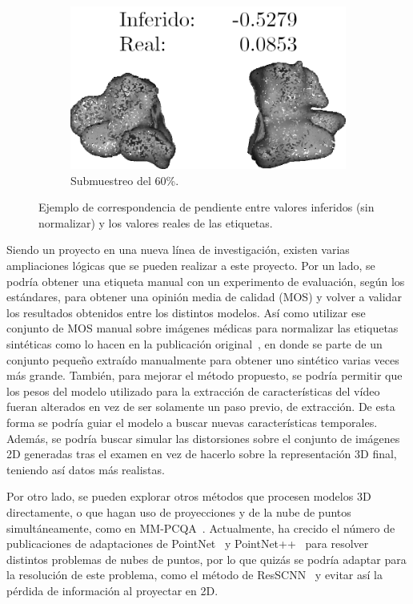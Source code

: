 \begin{figure}
  \begin{subfigure}[b]{0.31\textwidth}
  \centering
    \includegraphics[width=\textwidth]{imagenes/chapter6/Maxiliar100014_11.png}
  \caption{Submuestreo del 60\%.}
  \end{subfigure}
  \caption{Ejemplo de correspondencia de pendiente entre valores inferidos (sin normalizar) y 
  los valores reales de las etiquetas.} 
  \label{fig:Cualitativos}
\end{figure}


Siendo un proyecto en una nueva línea de investigación, existen varias ampliaciones 
lógicas que se pueden realizar a este proyecto. Por un lado, se podría 
obtener una etiqueta manual con un experimento de evaluación, según los estándares, para 
obtener una opinión media de calidad (MOS) y volver a validar los resultados obtenidos
entre los distintos modelos. Así como utilizar ese conjunto de MOS manual sobre imágenes médicas 
para normalizar las etiquetas sintéticas como lo hacen en la publicación original~\cite{ResSCNN}, 
en donde se parte de un conjunto pequeño extraído manualmente para obtener uno sintético varias 
veces más grande. También, para mejorar el método propuesto, se podría permitir 
que los pesos del modelo utilizado para la extracción de características 
del vídeo fueran alterados en vez de ser solamente un paso previo, de extracción. 
De esta forma se podría guiar el modelo a buscar nuevas características temporales.  
Además, se podría buscar simular las distorsiones 
sobre el conjunto de imágenes 2D generadas tras el examen en vez de hacerlo 
sobre la representación 3D final, teniendo así datos más realistas. 

Por otro lado, se pueden explorar otros métodos que procesen modelos 3D directamente, 
o que hagan uso de proyecciones y de la nube de puntos simultáneamente, como en MM-PCQA~\cite{MM-PCQA}.
Actualmente, ha crecido el número de publicaciones de adaptaciones de PointNet~\cite{PointNet} y 
PointNet++~\cite{PointNet++} para resolver distintos problemas de nubes de puntos, 
por lo que quizás se podría adaptar para la resolución de este problema, como 
el método de ResSCNN~\cite{ResSCNN} y evitar así 
la pérdida de información al proyectar en 2D.
